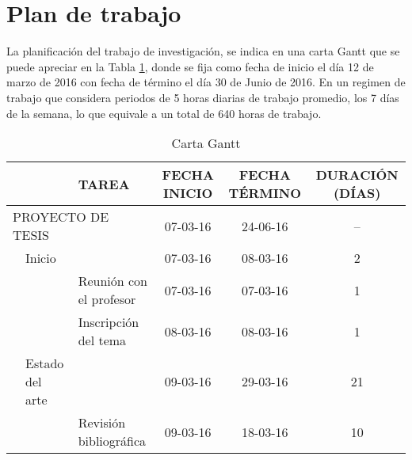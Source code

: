 \section{Plan de trabajo}
La planificación del trabajo de investigación, se indica en una carta Gantt que se puede apreciar en la Tabla \ref{tab:gantt}, donde se fija como fecha de inicio el día 12 de marzo de 2016 con fecha de término el día 30 de Junio de 2016. En un regimen de trabajo que considera periodos de 5 horas diarias de trabajo promedio, los 7 días de la semana, lo que equivale a un total de 640 horas de trabajo.

\begin{table}[H]
\centering
\caption{Carta Gantt}
\label{tab:gantt}
\scalebox{0.62} {
\begin{tabular}{lllccc}
\hline
					&							&TAREA												& FECHA INICIO		& FECHA TÉRMINO		& DURACIÓN (DÍAS)\\\hline
\multicolumn{3}{l}{PROYECTO DE TESIS}																& 07-03-16				&24-06-16				& --\\ \hline
					& Inicio					&													& 07-03-16				& 08-03-16				& 2\\
					&							& Reunión con el profesor							& 07-03-16				& 07-03-16				& 1\\
					&							& Inscripción del tema								& 08-03-16				& 08-03-16				& 1\\\hline
					& Estado del arte			&													& 09-03-16				& 29-03-16				& 21\\
					&							& Revisión bibliográfica							& 09-03-16				& 18-03-16				& 10\\

\end{tabular}}
\end{table}

